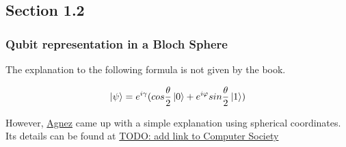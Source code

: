 \subsection{Section 1.2}
\subsubsection{Qubit representation in a Bloch Sphere}

The explanation to the following formula is not given by the book.

\[
\ket{\psi} = e^{i \gamma} (cos \frac{\theta}{2}\ket{0} + e^{i \varphi} sin \frac{\theta}{2} \ket{1})
\]

However, \href{https://github.com/victoragnez}{Agnez} came up with a simple explanation using spherical coordinates. Its details can be found at \href{https://www.google.com/}{TODO: add link to Computer Society}